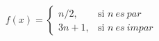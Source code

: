 \documentclass[preview]{standalone}
\begin{document}
\begin{align*}
f(x) = \begin{cases} n/2, & \text{si } n \ es \ par \\ 3n+1, & \text{si } n \ es \ impar \end{cases}
\end{align*}
\end{document}
